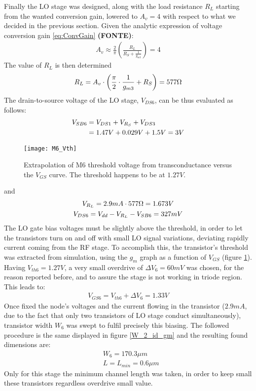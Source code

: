 Finally the LO stage was designed, along with the load resistance \(R_L\) starting from the wanted conversion gain, lowered to  \(A_v=4\) with respect to what we decided in the previous section. Given the analytic expression of voltage conversion gain \ref{eq:ConvGain} \textbf{(FONTE)}:
\begin{align}
	A_v \approx \frac{2}{\pi}\left( \frac{R_L}{R_S + \frac{1}{g_{m3}}}\right)=4 \nonumber
\end{align}
The value of \(R_L\) is then determined
\begin{align}
	R_L=A_v \cdot \left( \frac{\pi}{2} \cdot\frac{1}{g_{m3}} + R_S \right)=577 \ohm
\end{align}
The drain-to-source voltage of the LO stage, \(V_{DS6}\), can be thus evaluated as follows:
\begin{align}
	V_{SB6}&=V_{DS1}+V_{R_S}+V_{DS3} \notag\\
	&= 1.47V+0.029V+1.5V=3V \nonumber
\end{align}
\begin{figure}[H]
	\centering
	\texttt{[image: M6\_Vth]}
	\caption{Extrapolation of M6 threshold voltage from transconductance versus the \(V_{GS}\) curve. The threshold happens to be at \(1.27V\).}
	\label{M6_Vth}
\end{figure}
and 
\begin{gather}	
	V_{R_L}=2.9mA\cdot 577\ohm=1.673V \nonumber \\
	V_{DS6}=V_{dd}-V_{R_L}-V_{SB6}=327mV \nonumber
\end{gather}
The LO gate bias voltages must be slightly above the threshold, in order to let the transistors turn on and off with small LO signal variations, deviating rapidly current coming from the RF stage. To accomplish this, the transistor's threshold was extracted from simulation, using the \(g_{m}\) graph as a function of \(V_{GS}\) (figure \ref{M6_Vth}). 
Having \(V_{th6}=1.27V\), a very small overdrive of \( \Delta V_6=60mV \) was chosen, for the reason reported before, and to assure the stage is not working in triode region. This leads to:
\begin{align}
	V_{GS6}=V_{th6}+\Delta V_6=1.33V \nonumber
\end{align}
Once fixed the node's voltages and the current flowing in the transistor (\(2.9mA\), due to the fact that only two transistors of LO stage conduct simultaneously), transistor width \(W_6\) was swept to fulfil precisely this biasing. The followed procedure is the same displayed in figure \ref{W_2_id_gm} and the resulting found dimensions are:
\begin{align}
	&W_6=170.3\mu m \nonumber\\
	&L = L_{min} = 0.6\mu m \nonumber
\end{align}                                                                      
Only for this stage the minimum channel length was taken, in order to keep small these transistors regardless overdrive small value.
                                                                                 
